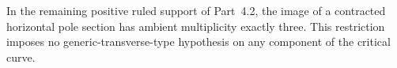 
\begin{proposition}[P4.52]\hypertarget{tag-02XR}{}\label{night:P4.52}\label{stmt:P4.52}


In the remaining positive ruled support of Part~4.2,
the image of a contracted horizontal pole section has
ambient multiplicity exactly three. This restriction
imposes no generic-transverse-type hypothesis on
any component of the critical curve.
\end{proposition}

